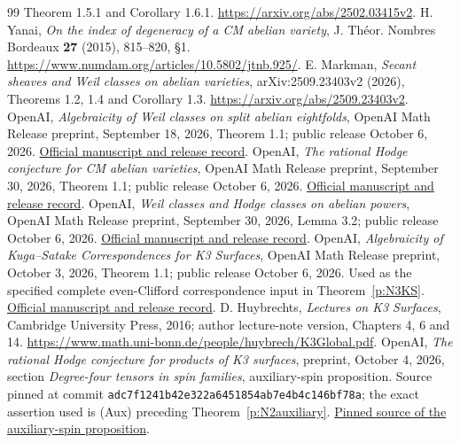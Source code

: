 \documentclass[11pt,reqno]{article}
\theoremstyle{emphasizedplain}
\theoremstyle{emphasizeddefinition}
\theoremstyle{emphasizeddefinition}
\begin{document}
\begin{thebibliography}{99}
Theorem 1.5.1 and Corollary 1.6.1.
\url{https://arxiv.org/abs/2502.03415v2}.
H. Yanai, \emph{On the index of degeneracy of a CM abelian variety},
J. Th\'eor. Nombres Bordeaux \textbf{27} (2015), 815--820, \S1.
\url{https://www.numdam.org/articles/10.5802/jtnb.925/}.
E. Markman, \emph{Secant sheaves and Weil classes on abelian varieties},
arXiv:2509.23403v2 (2026), Theorems 1.2, 1.4 and Corollary 1.3.
\url{https://arxiv.org/abs/2509.23403v2}.
OpenAI, \emph{Algebraicity of Weil classes on split abelian eightfolds},
OpenAI Math Release preprint, September 18, 2026, Theorem 1.1;
public release October 6, 2026.
\href{https://github.com/openai/math/blob/main/preprints/Algebraicity-of-Weil-classes-on-split-abelian-eightfolds-September-18-2026/README.md}{Official manuscript and release record}.
OpenAI, \emph{The rational Hodge conjecture for CM abelian varieties},
OpenAI Math Release preprint, September 30, 2026, Theorem 1.1;
public release October 6, 2026.
\href{https://github.com/openai/math/blob/main/preprints/The-rational-Hodge-conjecture-for-CM-abelian-varieties-September-30-2026/README.md}{Official manuscript and release record}.
OpenAI, \emph{Weil classes and Hodge classes on abelian powers},
OpenAI Math Release preprint, September 30, 2026, Lemma 3.2;
public release October 6, 2026.
\href{https://github.com/openai/math/blob/main/preprints/Weil-classes-and-Hodge-classes-on-abelian-powers-September-30-2026/README.md}{Official manuscript and release record}.
OpenAI, \emph{Algebraicity of Kuga--Satake Correspondences for K3 Surfaces},
OpenAI Math Release preprint, October 3, 2026, Theorem 1.1;
public release October 6, 2026. Used as the specified complete
even-Clifford correspondence input in Theorem~\ref{p:N3KS}.
\href{https://github.com/openai/math/blob/main/preprints/Algebraicity-of-Kuga-Satake-Correspondences-for-K3-Surfaces-October-3-2026/README.md}{Official manuscript and release record}.
D. Huybrechts, \emph{Lectures on K3 Surfaces}, Cambridge University
Press, 2016; author lecture-note version, Chapters 4, 6 and 14.
\url{https://www.math.uni-bonn.de/people/huybrech/K3Global.pdf}.
OpenAI, \emph{The rational Hodge conjecture for products of K3 surfaces},
preprint, October 4, 2026, section \emph{Degree-four tensors in spin
families}, auxiliary-spin proposition.
Source pinned at commit
\texttt{adc7f1241b42e322a6451854ab7e4b4c146bf78a};
the exact assertion used is (Aux) preceding
Theorem~\ref{p:N2auxiliary}.
\href{https://github.com/openai/math/blob/adc7f1241b42e322a6451854ab7e4b4c146bf78a/preprints/The-rational-Hodge-conjecture-for-products-of-K3-surfaces-October-4-2026/build/manuscript/auxiliary.tex}{Pinned source of the auxiliary-spin proposition}.
\end{thebibliography}
\end{document}
